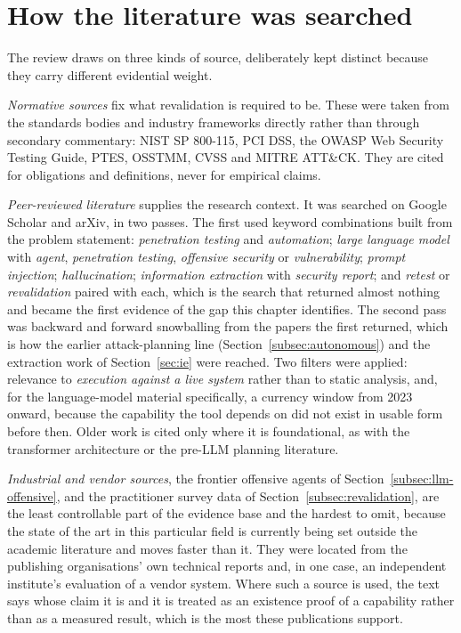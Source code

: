 \section{How the literature was searched}
\label{sec:search-strategy}

The review draws on three kinds of source, deliberately kept distinct because they
carry different evidential weight.

\emph{Normative sources} fix what revalidation is required to be. These were taken
from the standards bodies and industry frameworks directly rather than through
secondary commentary: NIST SP 800-115, PCI DSS, the OWASP Web Security Testing
Guide, PTES, OSSTMM, CVSS and MITRE ATT\&CK. They are cited for obligations and
definitions, never for empirical claims.

\emph{Peer-reviewed literature} supplies the research context. It was searched on
Google Scholar and arXiv, in two passes. The first used keyword combinations built
from the problem statement: \emph{penetration testing} and \emph{automation};
\emph{large language model} with \emph{agent}, \emph{penetration testing},
\emph{offensive security} or \emph{vulnerability}; \emph{prompt injection};
\emph{hallucination}; \emph{information extraction} with \emph{security report};
and \emph{retest} or \emph{revalidation} paired with each, which is the search that
returned almost nothing and became the first evidence of the gap this chapter
identifies. The second pass was backward and forward snowballing from the papers the
first returned, which is how the earlier attack-planning line
(Section~\ref{subsec:autonomous}) and the extraction work of
Section~\ref{sec:ie} were reached. Two filters were applied: relevance to
\emph{execution against a live system} rather than to static analysis, and, for the
language-model material specifically, a currency window from 2023 onward, because
the capability the tool depends on did not exist in usable form before then. Older
work is cited only where it is foundational, as with the transformer architecture or
the pre-LLM planning literature.

\emph{Industrial and vendor sources}, the frontier offensive agents of
Section~\ref{subsec:llm-offensive}, and the practitioner survey data of
Section~\ref{subsec:revalidation}, are the least controllable part of the
evidence base and the hardest to omit, because the state of the art in this
particular field is currently being set outside the academic literature and moves
faster than it. They were located from the publishing organisations' own technical
reports and, in one case, an independent institute's evaluation of a vendor system.
Where such a source is used, the text says whose claim it is and it is treated as an
existence proof of a capability rather than as a measured result, which is the most
these publications support.


